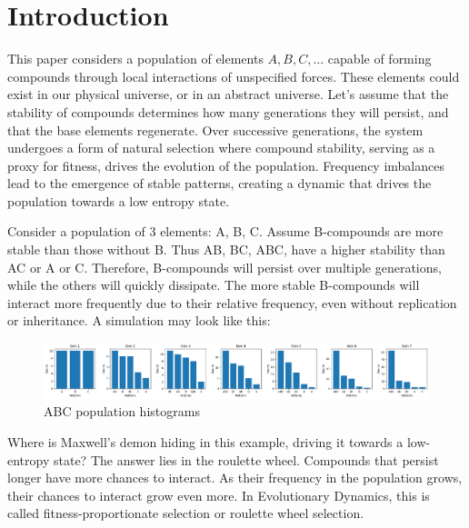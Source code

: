 \documentclass[entropy,article,submit,pdftex,moreauthors]{Definitions/mdpi}
\begin{document}


\section{Introduction}

This paper considers a population of elements \( A, B, C, \dots \) capable of forming compounds through local interactions of unspecified forces. These elements could exist in our physical universe, or in an abstract universe. Let's assume that the stability of compounds determines how many generations they will persist, and that the base elements regenerate. Over successive generations, the system undergoes a form of natural selection where compound stability, serving as a proxy for fitness, drives the evolution of the population. Frequency imbalances lead to the emergence of stable patterns, creating a dynamic that drives the population towards a low entropy state.

Consider a population of 3 elements: {A, B, C}. Assume B-compounds are more stable than those without B. Thus AB, BC, ABC, have a higher stability than AC or A or C. Therefore, B-compounds will persist over multiple generations, while the others will quickly dissipate. The more stable B-compounds will interact more frequently due to their relative frequency, even without replication or inheritance. A simulation may look like this:

\begin{figure}[htp]
    \centering
    \includegraphics[width=13cm]{pat_1}
    \caption{ABC population histograms}
    \label{fig:pat_1}
\end{figure}

Where is Maxwell's demon hiding in this example, driving it towards a low-entropy state? The answer lies in the roulette wheel. Compounds that persist longer have more chances to interact. As their frequency in the population grows, their chances to interact grow even more. In Evolutionary Dynamics, this is called fitness-proportionate selection or roulette wheel selection.
\end{document}
